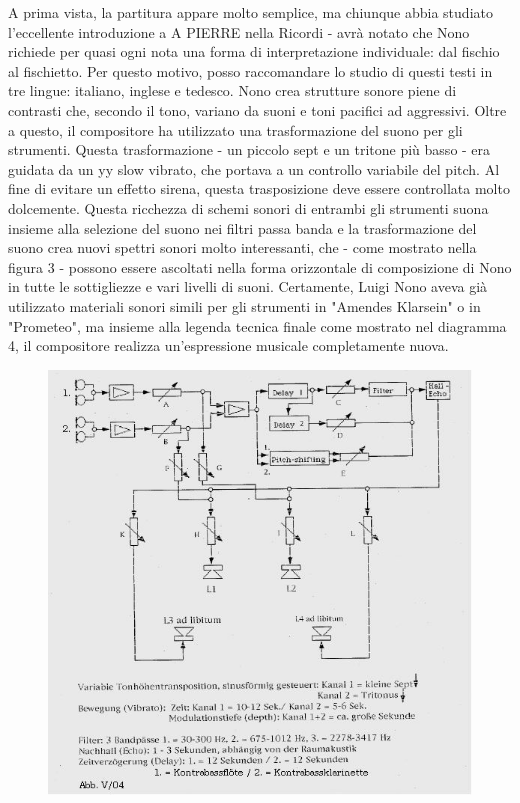 A prima vista, la partitura appare molto semplice, ma chiunque abbia studiato l'eccellente introduzione a A PIERRE nella Ricordi - avrà notato che Nono richiede per quasi ogni nota una forma di interpretazione individuale: dal fischio al fischietto. Per questo motivo, posso raccomandare lo studio di questi testi in tre lingue: italiano, inglese e tedesco.
Nono crea strutture sonore piene di contrasti che, secondo il tono, variano da suoni e toni pacifici ad aggressivi. Oltre a questo, il compositore ha utilizzato una trasformazione del suono per gli strumenti. Questa trasformazione - un piccolo sept e un tritone più basso - era guidata da un yy slow vibrato, che portava a un controllo variabile del pitch. Al fine di evitare un effetto sirena, questa trasposizione deve essere controllata molto dolcemente. Questa ricchezza di schemi sonori di entrambi gli strumenti suona insieme alla selezione del suono nei filtri passa banda e la trasformazione del suono crea nuovi spettri sonori molto interessanti, che - come mostrato nella figura 3 - possono essere ascoltati nella forma orizzontale di composizione di Nono in tutte le sottigliezze e vari livelli di suoni.
Certamente, Luigi Nono aveva già utilizzato materiali sonori simili per gli strumenti in "Amendes Klarsein" o in "Prometeo", ma insieme alla legenda tecnica finale come mostrato nel diagramma 4, il compositore realizza un'espressione musicale completamente nuova.

\begin{figure}[htbp]
\begin{center}
\includegraphics[width=1\textwidth]{images/nono/hph/ab_v_04.jpg}
\caption{}
\label{hph-img4}
\end{center}
\end{figure}

